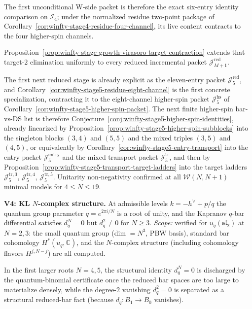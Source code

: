 \begin{remark}
The first unconditional W-side packet is therefore the exact six-entry
identity comparison on $\mathcal{I}_4$; under the normalized residue
two-point package of
Corollary~\ref{cor:winfty-stage4-residue-four-channel}, its live
content contracts to the four higher-spin channels.

Proposition~\ref{prop:winfty-stage-growth-virasoro-target-contraction}
extends that target-$2$ elimination uniformly to every reduced
incremental packet $\mathcal{J}_{M+1}^{\mathrm{red}}$.

The first next reduced stage is already explicit as the eleven-entry
packet $\mathcal{J}_5^{\mathrm{red}}$, and
Corollary~\ref{cor:winfty-stage5-residue-eight-channel} is the first
concrete specialization, contracting it to the eight-channel
higher-spin packet $\mathcal{J}_5^{\mathrm{hs}}$ of
Corollary~\ref{cor:winfty-stage5-higher-spin-packet}.  The next finite
higher-spin bar-vs-DS list is therefore
Conjecture~\ref{conj:winfty-stage5-higher-spin-identities}, already
linearized by
Proposition~\ref{prop:winfty-stage5-higher-spin-subblocks} into the
singleton blocks $(3,4)$ and $(5,5)$ and the mixed triples $(3,5)$ and
$(4,5)$, or equivalently by
Corollary~\ref{cor:winfty-stage5-entry-transport} into the entry packet
$\mathcal{J}_5^{\mathrm{entry}}$ and the mixed transport packet
$\mathcal{J}_5^{\mathrm{tr}}$, and then by
Proposition~\ref{prop:winfty-stage5-transport-target-ladders} into the
target ladders
$\mathcal{J}_5^{\mathrm{tr},3}$,
$\mathcal{J}_5^{\mathrm{tr},4}$,
$\mathcal{J}_5^{\mathrm{tr},5}$.
Unitarity non-negativity confirmed at all $\mathcal{W}(N, N{+}1)$
minimal models for $4 \leq N \leq 19$.

\smallskip
\noindent\textbf{V4: KL $N$-complex structure.}
At admissible levels $k = -h^\vee + p/q$ the quantum group parameter
$q = e^{2\pi i/N}$ is a root of unity, and the Kapranov $q$-bar
differential satisfies $d_q^N = 0$ but $d_q^2 \neq 0$ for $N \geq 3$.
\emph{Scope:}
verified for $u_q(\mathfrak{sl}_2)$ at $N = 2, 3$: the small quantum
group (dim $= N^3$, PBW basis), standard bar cohomology
$H^*(u_q, \mathbb{C})$, and the $N$-complex structure (including
cohomology flavors $H^{j, N-j}$) are all computed.

In the first larger roots $N=4,5$, the structural identity $d_q^N=0$
is discharged by the quantum-binomial certificate once the reduced bar
spaces are too large to materialize densely, while the degree-$2$
vanishing $d_q^2=0$ is separated as a structural reduced-bar fact
\textup{(}because $d_q\colon B_1\to B_0$ vanishes\textup{)}.


\end{remark}
